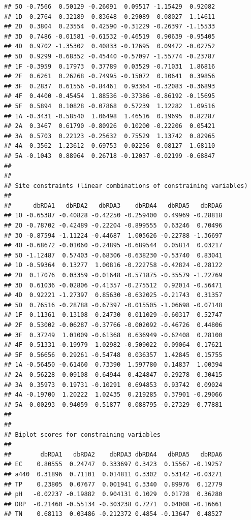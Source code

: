 \documentclass[
]{book}
\begin{document}
\begin{verbatim}
## 5O -0.7566  0.50129 -0.26091  0.09517 -1.15429  0.92082
## 1D -0.2764  0.32189  0.83648 -0.29089  0.08027  1.14611
## 2D  0.3804  0.23554  0.42590 -0.31229 -0.26397 -1.15533
## 3D  0.7486 -0.01581 -0.61532 -0.46519  0.90639 -0.95405
## 4D  0.9702 -1.35302  0.40833 -0.12695  0.09472 -0.02752
## 5D  0.9299 -0.68352 -0.45440 -0.57097 -1.55774 -0.23787
## 1F -0.3959  0.17973  0.37789  0.03529 -0.71031  1.86816
## 2F  0.6261  0.26268 -0.74995 -0.15072  0.10641  0.39856
## 3F  0.2837  0.61556 -0.84461  0.93364 -0.32083 -0.36893
## 4F  0.4400 -0.45454  1.88536 -0.37386 -0.86192 -0.15695
## 5F  0.5894  0.10828 -0.07868  0.57239  1.12282  1.09516
## 1A -0.3431 -0.58540  1.06498  1.46516  0.19695  0.82287
## 2A  0.3467  0.61790 -0.80926  0.10200 -0.22206  0.05421
## 3A  0.5703  0.22123 -0.25632  0.75529  1.13742  0.82965
## 4A -0.3562  1.23612  0.69753  0.02256  0.08127 -1.68110
## 5A -0.1043  0.88964  0.26718 -0.12037 -0.02199 -0.68847
## 
## 
## Site constraints (linear combinations of constraining variables)
## 
##      dbRDA1   dbRDA2   dbRDA3    dbRDA4   dbRDA5   dbRDA6
## 1O -0.65387 -0.40828 -0.42250 -0.259400  0.49969 -0.28818
## 2O -0.78702 -0.42489 -0.22204 -0.899555  0.63246  0.70496
## 3O -0.87594 -1.11224 -0.44687  1.005626 -0.22788 -1.36697
## 4O -0.68672 -0.01060 -0.24895 -0.689544  0.05814  0.03217
## 5O -1.12487  0.57403 -0.68306 -0.638230 -0.53740  0.83041
## 1D -0.59364  0.13277  1.00816 -0.222758 -0.42824 -0.28122
## 2D  0.17076  0.03359 -0.01648 -0.571875 -0.35579 -1.22769
## 3D  0.61036 -0.02806 -0.41357 -0.275512  0.92014 -0.56471
## 4D  0.92221 -1.27397  0.85630 -0.632025 -0.21743  0.31357
## 5D  0.76516 -0.28788 -0.67397 -0.015505 -1.06698 -0.07148
## 1F  0.11361  0.13108  0.24730  0.011029 -0.60317  0.52747
## 2F  0.53002 -0.06287 -0.37766 -0.002092 -0.46726  0.44806
## 3F  0.37249  1.01009 -0.61368  0.636949 -0.62408  0.28100
## 4F  0.51331 -0.19979  1.02982 -0.509022  0.09064  0.17621
## 5F  0.56656  0.29261 -0.54748  0.036357  1.42845  0.15755
## 1A -0.56450 -0.61460  0.73390  1.597780  0.14837  1.00394
## 2A  0.56228 -0.09108 -0.64944  0.424847 -0.29278  0.30415
## 3A  0.35973  0.19731 -0.10291  0.694853  0.93742  0.09024
## 4A -0.19700  1.20222  1.02435  0.219285  0.37901 -0.29066
## 5A -0.00293  0.94059  0.51877  0.088795 -0.27329 -0.77881
## 
## 
## Biplot scores for constraining variables
## 
##        dbRDA1   dbRDA2    dbRDA3 dbRDA4   dbRDA5   dbRDA6
## EC    0.80555  0.24747  0.333697 0.3423  0.15567 -0.19257
## a440  0.31896  0.71101  0.014811 0.3302  0.53142 -0.03271
## TP    0.23805  0.07677  0.001941 0.3340  0.89976  0.12779
## pH   -0.02237 -0.19882  0.904131 0.1029  0.01728  0.36280
## DRP  -0.21460 -0.55134 -0.303238 0.7271  0.04008 -0.16661
## TN    0.68113  0.03486 -0.212372 0.4854 -0.13647  0.48527
\end{verbatim}
\end{document}
